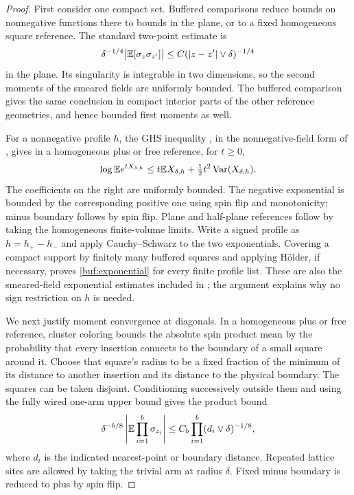 \begin{proof}
First consider one compact set.  Buffered comparisons reduce bounds
on nonnegative functions there to bounds in the plane, or to a fixed
homogeneous square reference.  The standard two-point estimate is
\[
 \delta^{-1/4}\bigl|\mathbb E[\sigma_z\sigma_{z'}]\bigr|
 \le C(|z-z'|\vee\delta)^{-1/4}
\]
in the plane.  Its singularity is integrable in two dimensions, so
the second moments of the smeared fields are uniformly bounded.
The buffered comparison gives the same conclusion in compact
interior parts of the other reference geometries, and hence bounded
first moments as well.

For a nonnegative profile $h$, the GHS inequality
\cite[Theorem~2]{GHS1970}, in the nonnegative-field form of
\cite[Theorem~3.6]{CGN2015}, gives in a homogeneous plus or free
reference, for $t\ge0$,
\[
 \log\mathbb E e^{tX_{\delta,h}}
 \le t\mathbb E X_{\delta,h}
       +\tfrac12t^2\operatorname{Var}(X_{\delta,h}).
\]
The coefficients on the right are uniformly bounded.  The negative
exponential is bounded by the corresponding positive one using
spin flip and monotonicity; minus boundary follows by spin flip.
Plane and half-plane references follow by taking the homogeneous
finite-volume limits.  Write a signed profile as $h=h_+-h_-$ and
apply Cauchy--Schwarz to the two exponentials.  Covering a compact
support by finitely many buffered squares and applying H\"older,
if necessary, proves \eqref{buf:exponential} for every finite profile
list.  These are also the smeared-field exponential estimates
included in ; the argument explains why no sign
restriction on $h$ is needed.

We next justify moment convergence at diagonals.  In a homogeneous
plus or free reference, cluster coloring bounds the absolute spin
product mean by the probability that every insertion connects to
the boundary of a small square around it.  Choose that square's
radius to be a fixed fraction of the minimum of its distance to
another insertion and its distance to the physical boundary.
The squares can be taken disjoint.  Conditioning successively
outside them and using the fully wired one-arm upper bound gives
the product bound
\begin{equation}
 \delta^{-b/8}\left|\mathbb E\prod_{i=1}^b\sigma_{z_i}\right|
 \le C_b\prod_{i=1}^b(d_i\vee\delta)^{-1/8},
 \label{buf:product-arm}
\end{equation}
where $d_i$ is the indicated nearest-point or boundary distance.
Repeated lattice sites are allowed by taking the trivial arm at
radius $\delta$.  Fixed minus boundary is reduced to plus by spin
flip.


\end{proof}
